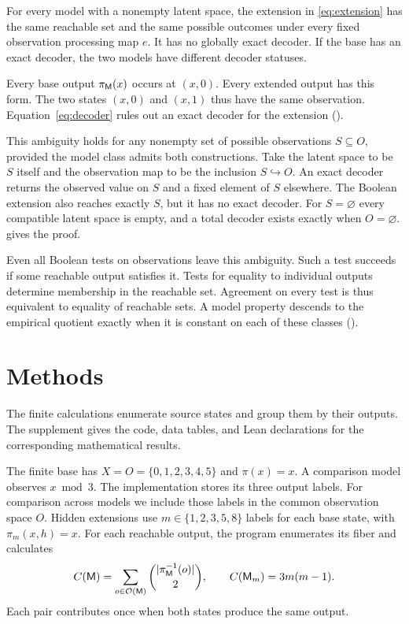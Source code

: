 \begin{theorem}
For every model with a nonempty latent space, the extension in \eqref{eq:extension} has the same reachable set and the same possible outcomes under every fixed observation processing map \(e\). It has no globally exact decoder. If the base has an exact decoder, the two models have different decoder statuses.
\label{thm:mainhidden}
\end{theorem}

Every base output \(\pi_\mathsf M(x)\) occurs at \((x,0)\). Every extended output has this form. The two states \((x,0)\) and \((x,1)\) thus have the same observation. Equation~\eqref{eq:decoder} rules out an exact decoder for the extension ().

This ambiguity holds for any nonempty set of possible observations \(S\subseteq O\), provided the model class admits both constructions. Take the latent space to be \(S\) itself and the observation map to be the inclusion \(S\hookrightarrow O\). An exact decoder returns the observed value on \(S\) and a fixed element of \(S\) elsewhere. The Boolean extension also reaches exactly \(S\), but it has no exact decoder. For \(S=\varnothing\) every compatible latent space is empty, and a total decoder exists exactly when \(O=\varnothing\).  gives the proof.

Even all Boolean tests on observations leave this ambiguity. Such a test succeeds if some reachable output satisfies it. Tests for equality to individual outputs determine membership in the reachable set. Agreement on every test is thus equivalent to equality of reachable sets. A model property descends to the empirical quotient exactly when it is constant on each of these classes ().

\section{Methods}
\label{sec:mainmethods}
The finite calculations enumerate source states and group them by their outputs. The supplement gives the code, data tables, and Lean declarations for the corresponding mathematical results.

The finite base has \(X=O=\{0,1,2,3,4,5\}\) and \(\pi(x)=x\). A comparison model observes \(x\bmod3\). The implementation stores its three output labels. For comparison across models we include those labels in the common observation space \(O\). Hidden extensions use \(m\in\{1,2,3,5,8\}\) labels for each base state, with \(\pi_m(x,h)=x\). For each reachable output, the program enumerates its fiber and calculates
\begin{equation}
C(\mathsf M)=\sum_{o\in\mathcal O(\mathsf M)}\binom{|\pi_\mathsf M^{-1}(o)|}{2},
\qquad C(\mathsf M_m)=3m(m-1).
\label{eq:collisions}
\end{equation}
Each pair contributes once when both states produce the same output.

